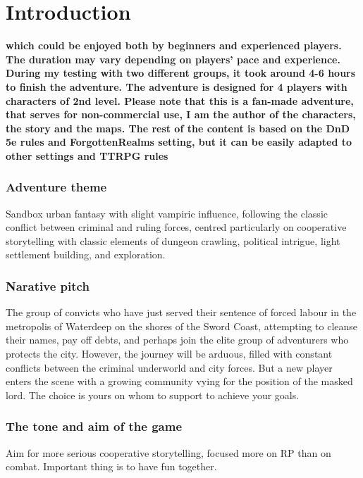 \documentclass[10pt,twoside,twocolumn,openany,nodepracetedcode]{dndbook}
\begin{document}
\tableofcontents

\mainmatter%

\chapter{Introduction}

\textbf{which could be enjoyed both by beginners and experienced players. The duration may vary depending on players'
pace and experience. During my testing with two different groups, it took around 4-6 hours to finish the adventure.
The adventure is designed for 4 players with characters of 2nd level. Please note that this is a fan-made adventure,
  that serves for non-commercial use, I am the author of the characters, the story and the maps. The rest of the content
  is based on the DnD 5e rules and ForgottenRealms setting, but it can be easily adapted to other settings and TTRPG rules}




\subsection{Adventure theme}
Sandbox urban fantasy with slight vampiric influence, following the classic conflict between criminal and ruling forces,
centred particularly on cooperative storytelling with classic elements of dungeon crawling, political intrigue, light settlement building, and exploration.

\subsection*{Narative pitch}
The group of convicts who have just served their sentence of forced labour in the metropolis of Waterdeep on the shores of the Sword Coast,
attempting to cleanse their names, pay off debts, and perhaps join the elite group of adventurers who protects the city.
However, the journey will be arduous, filled with constant conflicts between the criminal underworld and city forces.
But a new player enters the scene with a growing community vying for the position of the masked lord.
The choice is yours on whom to support to achieve your goals.

\subsection*{The tone and aim of the game}
Aim for more serious cooperative storytelling, focused more on RP than on combat. Important thing is to have fun together.
\end{document}
